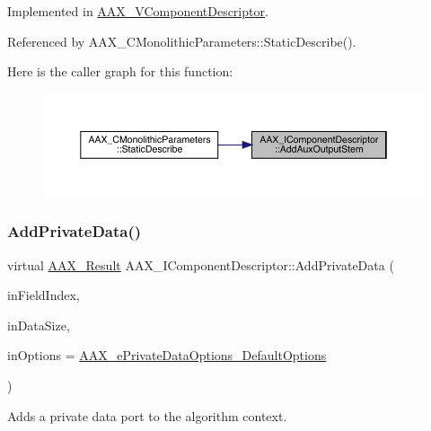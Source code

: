 Implemented in \mbox{\hyperlink{a01901_a51525dd1833baa062d840d7df7225305}{A\+A\+X\+\_\+\+V\+Component\+Descriptor}}.



Referenced by A\+A\+X\+\_\+\+C\+Monolithic\+Parameters\+::\+Static\+Describe().

Here is the caller graph for this function\+:
\nopagebreak
\begin{figure}[H]
\begin{center}
\leavevmode
\includegraphics[width=350pt]{a01781_a76266e8a07ce20cdbe5721172c32a93d_icgraph}
\end{center}
\end{figure}
\mbox{\label{a01781_a125949841a13e97ff93fa321f2050433}} 
\subsubsection{\texorpdfstring{AddPrivateData()}{AddPrivateData()}}
{\footnotesize\ttfamily virtual \mbox{\hyperlink{a00392_a4d8f69a697df7f70c3a8e9b8ee130d2f}{A\+A\+X\+\_\+\+Result}} A\+A\+X\+\_\+\+I\+Component\+Descriptor\+::\+Add\+Private\+Data (\begin{DoxyParamCaption}\item[{\mbox{\hyperlink{a00392_ae807f8986143820cfb5d6da32165c9c7}{A\+A\+X\+\_\+\+C\+Field\+Index}}}]{in\+Field\+Index,  }\item[{int32\+\_\+t}]{in\+Data\+Size,  }\item[{uint32\+\_\+t}]{in\+Options = {\ttfamily \mbox{\hyperlink{a00491_a9f1ef2cb64daf30eaf145dfbb8cd0d00a59458e9bf18919c51e59eb2fd6e84a9a}{A\+A\+X\+\_\+e\+Private\+Data\+Options\+\_\+\+Default\+Options}}} }\end{DoxyParamCaption})\hspace{0.3cm}{\ttfamily [pure virtual]}}



Adds a private data port to the algorithm context. 

